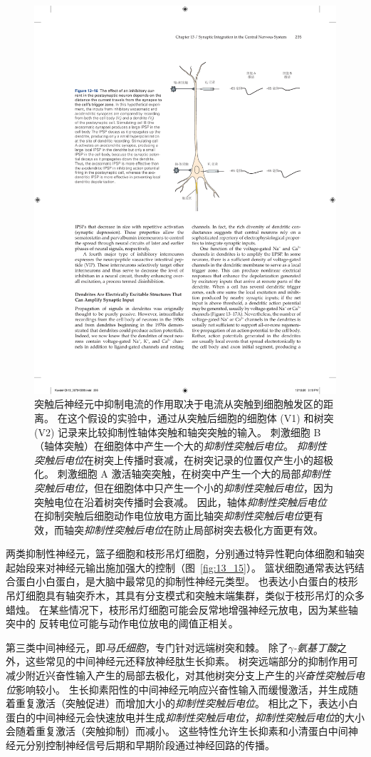 \begin{figure}[htbp]
	\centering
	\includegraphics[width=0.65\linewidth]{chap13/fig_13_16}
	\caption{突触后神经元中抑制电流的作用取决于电流从突触到细胞触发区的距离。
		在这个假设的实验中，通过从突触后细胞的细胞体 (V1) 和树突 (V2) 记录来比较抑制性轴体突触和轴突突触的输入。
		刺激细胞 B（轴体突触）在细胞体中产生一个大的\textit{抑制性突触后电位}。
		\textit{抑制性突触后电位}在树突上传播时衰减，在树突记录的位置仅产生小的超极化。
		刺激细胞 A 激活轴突突触，在树突中产生一个大的局部\textit{抑制性突触后电位}，但在细胞体中只产生一个小的\textit{抑制性突触后电位}，因为突触电位在沿着树突传播时会衰减。
		因此，轴体\textit{抑制性突触后电位}在抑制突触后细胞动作电位放电方面比轴突\textit{抑制性突触后电位}更有效，而轴突\textit{抑制性突触后电位}在防止局部树突去极化方面更有效。}
	\label{fig:13_16}
\end{figure}


两类抑制性神经元，篮子细胞和枝形吊灯细胞，分别通过特异性靶向体细胞和轴突起始段来对神经元输出施加强大的控制（图~\ref{fig:13_15}）。
篮状细胞通常表达钙结合蛋白小白蛋白，是大脑中最常见的抑制性神经元类型。
也表达小白蛋白的枝形吊灯细胞具有轴突乔木，其具有分支模式和突触末端集群，类似于枝形吊灯的众多蜡烛。
在某些情况下，枝形吊灯细胞可能会反常地增强神经元放电，因为某些轴突中的  反转电位可能与动作电位放电的阈值正相关。


第三类中间神经元，即\textit{马氏细胞}，专门针对远端树突和棘。
除了\textit{$\gamma$-氨基丁酸}之外，这些常见的中间神经元还释放神经肽生长抑素。
树突远端部分的抑制作用可减少附近兴奋性输入产生的局部去极化，对其他树突分支上产生的\textit{兴奋性突触后电位}影响较小。
生长抑素阳性的中间神经元响应兴奋性输入而缓慢激活，并生成随着重复激活（突触促进）而增加大小的\textit{抑制性突触后电位}。 
相比之下，表达小白蛋白的中间神经元会快速放电并生成\textit{抑制性突触后电位}，\textit{抑制性突触后电位}的大小会随着重复激活（突触抑制）而减小。
这些特性允许生长抑素和小清蛋白中间神经元分别控制神经信号后期和早期阶段通过神经回路的传播。


